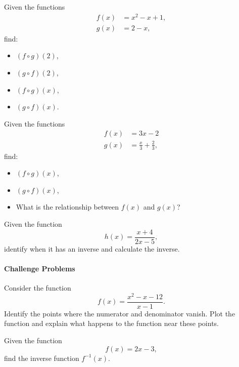 \begin{problem}
Given the functions
\begin{align*}
f(x)&=x^2-x+1,\\
g(x)&=2-x,
\end{align*}
find:
\begin{itemize}
\item $\left(f\circ g\right)(2)$,
\item $\left(g\circ f\right)(2)$,
\item $\left(f\circ g\right)(x)$,
\item $\left(g\circ f\right)(x)$.
\end{itemize}
\end{problem}


\begin{problem}[$\star$]
Given the functions
\begin{align*}
f(x)&=3x-2\\
g(x)&=\frac{x}{3}+\frac{2}{3},
\end{align*}
find:
\begin{itemize}
\item $\left(f\circ g\right)(x)$,
\item $\left(g\circ f\right)(x)$,
\item What is the relationship between $f(x)$ and $g(x)$?
\end{itemize}
\end{problem}


\begin{problem}[$\dagger$]
Given the function
\begin{equation*}
h(x)=\frac{x+4}{2x-5},
\end{equation*}
identify when it has an inverse and calculate the inverse.
\end{problem}

\paragraph{Challenge Problems}

\begin{problem}
Consider the function 
\begin{equation*}
f(x)=\frac{x^{2}-x-12}{x-1}.
\end{equation*}
Identify the points where the numerator and denominator vanish. Plot the function and explain what happens to the function near these points.
\end{problem}

\begin{problem}
Given the function 
\begin{equation*}
f(x)=2x-3,
\end{equation*}
find the inverse function $f^{-1}(x)$.
\end{problem}


